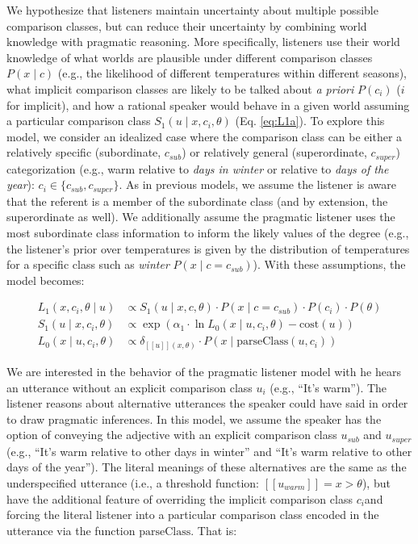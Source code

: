 \documentclass[doc]{apa6}
\begin{document}
We hypothesize that listeners maintain uncertainty about multiple
possible comparison classes, but can reduce their uncertainty by
combining world knowledge with pragmatic reasoning. More specifically,
listeners use their world knowledge of what worlds are plausible under
different comparison classes \(P(x \mid c)\) (e.g., the likelihood of
different temperatures within different seasons), what implicit
comparison classes are likely to be talked about \emph{a priori}
\(P(c_i)\) (\(i\) for implicit), and how a rational speaker would behave
in a given world assuming a particular comparison class
\(S_{1}(u \mid x, c_i, \theta)\) (Eq. \ref{eq:L1a}). To explore this
model, we consider an idealized case where the comparison class can be
either a relatively specific (subordinate, \(c_{sub}\)) or relatively
general (superordinate, \(c_{super}\)) categorization (e.g., warm
relative to \emph{days in winter} or relative to \emph{days of the
year}): \(c_i \in \{c_{sub}, c_{super}\}\). As in previous models, we
assume the listener is aware that the referent is a member of the
subordinate class (and by extension, the superordinate as well). We
additionally assume the pragmatic listener uses the most subordinate
class information to inform the likely values of the degree (e.g., the
listener's prior over temperatures is given by the distribution of
temperatures for a specific class such as \emph{winter}
\(P(x \mid c = c_{sub})\)). With these assumptions, the model becomes:

\begin{align}
L_{1}(x, c_{i}, \theta \mid u) &\propto S_{1}(u \mid x, c, \theta) \cdot P(x \mid c =  c_{sub}) \cdot P(c_{i}) \cdot P(\theta) \label{eq:L1a}\\
S_{1}(u \mid x, c_i, \theta) &\propto \exp{(\alpha_1 \cdot \ln {L_{0}(x \mid u, c_i, \theta)}- \text{cost}(u)) } \label{eq:S1a}\\
L_{0}(x \mid u, c_i, \theta) &\propto {\delta_{[\![u]\!](x, \theta)} \cdot P(x \mid \text{parseClass}(u, c_i))} \label{eq:L0a}
\end{align}

We are interested in the behavior of the pragmatic listener model with
he hears an utterance without an explicit comparison class \(u_{i}\)
(e.g., ``It's warm''). The listener reasons about alternative
utterances the speaker could have said in order to draw pragmatic
inferences. In this model, we assume the speaker has the option of
conveying the adjective with an explicit comparison class \(u_{sub}\)
and \(u_{super}\) (e.g., ``It's warm relative to other days in
winter'' and ``It's warm relative to other days of the year'').
The literal meanings of these alternatives are the same as the
underspecified utterance (i.e., a threshold function:
\([\![u_{warm}]\!] = x > \theta\)), but have the additional feature of
overriding the implicit comparison class \(c_i\)and forcing the literal
listener into a particular comparison class encoded in the utterance via
the function \(\text{parseClass}\). That is:
\end{document}

